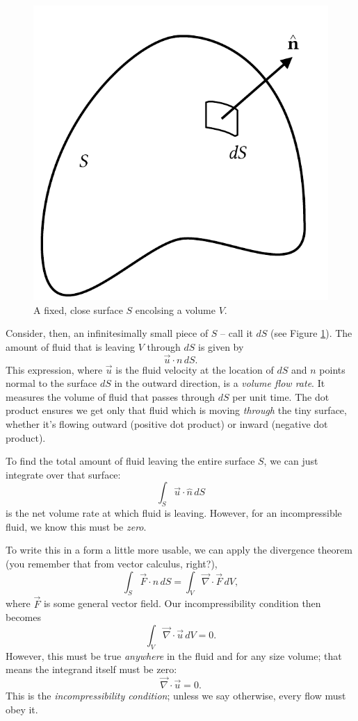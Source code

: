 \begin{figure}
\centering
\includegraphics[width=0.5\linewidth]{Figures/Chapter1/fig_closed_surface}
\caption{A fixed, close surface $S$ encolsing a volume $V$.}
\label{fig_closed_surface}
\end{figure}

Consider, then, an infinitesimally small piece of $S$ -- call it $dS$ (see Figure \ref{fig_closed_surface}).  The amount of fluid that is leaving $V$ through $dS$ is given by
\[
\vec{u} \cdot \unit{n} \, dS.
\]
This expression, where $\vec{u}$ is the fluid velocity at the location of $dS$ and $\unit{n}$ points normal to the surface $dS$ in the outward direction, is a \emph{volume flow rate}.  It measures the volume of fluid that passes through $dS$ per unit time.  The dot product ensures we get only that fluid which is moving \emph{through} the tiny surface, whether it's flowing outward (positive dot product) or inward (negative dot product).

To find the total amount of fluid leaving the entire surface $S$, we can just integrate over that surface:
\[
\int_S \vec{u} \cdot \hat{n} \, dS
\]
is the net volume rate at which fluid is leaving.  However, for an incompressible fluid, we know this must be \emph{zero}.

To write this in a form a little more usable, we can apply the divergence theorem (you remember that from vector calculus, right?),
\[
\int_S \vec{F} \cdot \unit{n} \, dS = \int_V \vec{\nabla} \cdot \vec{F} \, dV,
\]
where $\vec{F}$ is some general vector field.  Our incompressibility condition then becomes
\[
\int_V \vec{\nabla} \cdot \vec{u} \, dV = 0.
\]
However, this must be true \emph{anywhere} in the fluid and for any size volume; that means the integrand itself must be zero:
\begin{equation}
\label{eq_incompressibility}
\boxed{
\vec{\nabla} \cdot \vec{u} = 0.
}
\end{equation}
This is the \emph{incompressibility condition}; unless we say otherwise, every flow must obey it.


